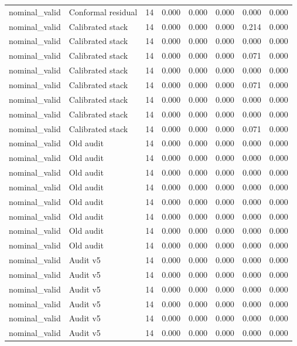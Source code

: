 {\begin{longtable}{llrrrrrr}
nominal\_valid & Conformal residual & 14 & 0.000 & 0.000 & 0.000 & 0.000 & 0.000 \\
nominal\_valid & Calibrated stack & 14 & 0.000 & 0.000 & 0.000 & 0.214 & 0.000 \\
nominal\_valid & Calibrated stack & 14 & 0.000 & 0.000 & 0.000 & 0.000 & 0.000 \\
nominal\_valid & Calibrated stack & 14 & 0.000 & 0.000 & 0.000 & 0.071 & 0.000 \\
nominal\_valid & Calibrated stack & 14 & 0.000 & 0.000 & 0.000 & 0.000 & 0.000 \\
nominal\_valid & Calibrated stack & 14 & 0.000 & 0.000 & 0.000 & 0.071 & 0.000 \\
nominal\_valid & Calibrated stack & 14 & 0.000 & 0.000 & 0.000 & 0.000 & 0.000 \\
nominal\_valid & Calibrated stack & 14 & 0.000 & 0.000 & 0.000 & 0.000 & 0.000 \\
nominal\_valid & Calibrated stack & 14 & 0.000 & 0.000 & 0.000 & 0.071 & 0.000 \\
nominal\_valid & Old audit & 14 & 0.000 & 0.000 & 0.000 & 0.000 & 0.000 \\
nominal\_valid & Old audit & 14 & 0.000 & 0.000 & 0.000 & 0.000 & 0.000 \\
nominal\_valid & Old audit & 14 & 0.000 & 0.000 & 0.000 & 0.000 & 0.000 \\
nominal\_valid & Old audit & 14 & 0.000 & 0.000 & 0.000 & 0.000 & 0.000 \\
nominal\_valid & Old audit & 14 & 0.000 & 0.000 & 0.000 & 0.000 & 0.000 \\
nominal\_valid & Old audit & 14 & 0.000 & 0.000 & 0.000 & 0.000 & 0.000 \\
nominal\_valid & Old audit & 14 & 0.000 & 0.000 & 0.000 & 0.000 & 0.000 \\
nominal\_valid & Old audit & 14 & 0.000 & 0.000 & 0.000 & 0.000 & 0.000 \\
nominal\_valid & Audit v5 & 14 & 0.000 & 0.000 & 0.000 & 0.000 & 0.000 \\
nominal\_valid & Audit v5 & 14 & 0.000 & 0.000 & 0.000 & 0.000 & 0.000 \\
nominal\_valid & Audit v5 & 14 & 0.000 & 0.000 & 0.000 & 0.000 & 0.000 \\
nominal\_valid & Audit v5 & 14 & 0.000 & 0.000 & 0.000 & 0.000 & 0.000 \\
nominal\_valid & Audit v5 & 14 & 0.000 & 0.000 & 0.000 & 0.000 & 0.000 \\
nominal\_valid & Audit v5 & 14 & 0.000 & 0.000 & 0.000 & 0.000 & 0.000 \\

\end{longtable}}
